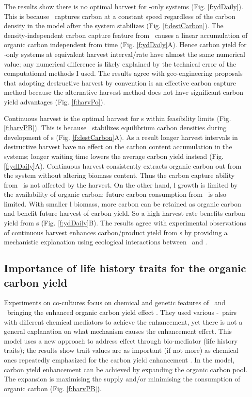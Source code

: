 \documentclass[env.tex]{subfiles}
\begin{document}
The results show there is no optimal harvest for \phy-only systems (Fig. \ref{f:ydDaily}).  This is because \phy\ captures carbon at a constant speed regardless of the carbon density in the model after the system stabilizes (Fig. \ref{f:destCarbon}).  The density-independent carbon capture feature from \phy\ causes a linear accumulation of organic carbon independent from time (Fig. \ref{f:ydDaily}A).  Hence carbon yield for \phy-only systems at equivalent harvest interval/rate have almost the same numerical value; any numerical difference is likely explained by the technical error of the computational methods I used.  The results agree with geo-engineering proposals that adopting destructive harvest by convention is an effective carbon capture method because the alternative harvest method does not have significant carbon yield advantages (Fig. \ref{f:harvPo}).

Continuous harvest is the optimal harvest for \pbs s within feasibility limits (Fig. \ref{f:harvPB}).  This is because \bac\ stabilizes equilibrium carbon densities during development of \pbs s (Fig. \ref{f:destCarbon}A).  As a result longer harvest intervals in destructive harvest have no effect on the carbon content accumulation in the systems; longer waiting time lowers the average carbon yield instead (Fig. \ref{f:ydDaily}A).  Continuous harvest consistently extracts organic carbon out from the system without altering biomass content.  Thus the carbon capture ability from \phy\ is not affected by the harvest.  On the other hand, \bac l growth is limited by the availability of organic carbon; future carbon consumption from \bac\ is also limited.  With smaller \bac l biomass, more carbon can be retained as organic carbon and benefit future harvest of carbon yield.  So a high harvest rate benefits carbon yield from \pbs s (Fig. \ref{f:ydDaily}B).  The results agree with experimental observations of continuous harvest enhances carbon/product yield from \pbs s \autocite{kim2008anaerobic,choix2012enhanced1,choix2012enhanced2,leyva2014accumulation} by providing a mechanistic explanation using ecological interactions between \phy\ and \bac.

\subsection{Importance of life history traits for the organic carbon yield}
Experiments on co-cultures focus on chemical and genetic features of \phy\ and \bac\ bringing the enhanced organic carbon yield effect \autocite{seyedsayamdost2011roseobacticides,durham2015cryptic,amin2009photolysis}.  They used various \phy-\bac\ pairs with different chemical mediators to achieve the enhancement, yet there is not a general explanation on what mechanism causes the enhancement effect.  This model uses a new approach to address effect through bio-mediator (life history traits); the results show trait values are as important (if not more) as chemical ones repeatedly emphasized for the carbon yield enhancement \autocite{fuentes2016impact}.  In the model, carbon yield enhancement can be achieved by expanding the organic carbon pool.  The expansion is maximising the supply and/or minimising the consumption of organic carbon (Fig. \ref{f:harvPB}).
\end{document}
